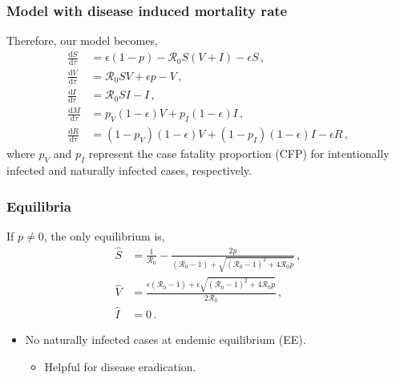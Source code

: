 \documentclass[12pt]{beamer}
\newcommand\dbyd[2]{\frac{\mathrm d{#1}}{\mathrm d{#2}}}
\newcommand{\R}{\mathcal{R}}
\newcommand{\pmV}{p_{V}}
\newcommand{\pmI}{p_{I}}
\begin{document}
\begin{frame}
\frametitle{Model with disease induced mortality rate}

Therefore, our model becomes,
\begin{subequations}\label{eq:base_ODE}
\begin{align}
\dbyd{S}{\tau}&=\epsilon(1-p)- \R_0 S(V+I)-\epsilon S\,, \label{eq:S_by_tau}\\
\dbyd{V}{\tau}&=\R_0 SV+\epsilon p-V\,, \label{eq:V_by_tau}\\
\dbyd{I}{\tau}&=\R_0 SI-I\,, \label{eq:I_by_tau}\\
\dbyd{M}{\tau}&=\pmV(1-\epsilon) V+\pmI(1-\epsilon) I\,,\\
\dbyd{R}{\tau}&=(1-\pmV)(1-\epsilon) V+(1-\pmI)(1-\epsilon) I-\epsilon R\,,
\end{align}
\end{subequations}
where $\pmV$ and $\pmI$ represent the case fatality proportion (CFP)
for intentionally infected and naturally infected cases, respectively.
\end{frame}
\begin{frame}
\frametitle{Equilibria}

If $p\neq 0$, the only equilibrium is,
\begin{subequations}
\begin{align}
\hat{S}&= \frac{1}{\R_0}-\frac{2p}{(\R_0 -1)+ \sqrt{(\R_0-1)^2+4\R_0
         p}}\,, \label{eq:Shat}\\
\hat{V}&= \frac{\epsilon(\R_0 -1)+ \epsilon \sqrt{(\R_0-1)^2+4\R_0 p}}{2\R_0}\,, \label{eq:Vhat}\\
\hat{I}&=0\,. \label{eq:Ihat}
\end{align}
\end{subequations}

\begin{itemize}
\item No naturally infected cases at endemic equilibrium (EE).
\begin{itemize}
\item Helpful for disease eradication.
\end{itemize}
\end{itemize}
\end{frame}
\end{document}
